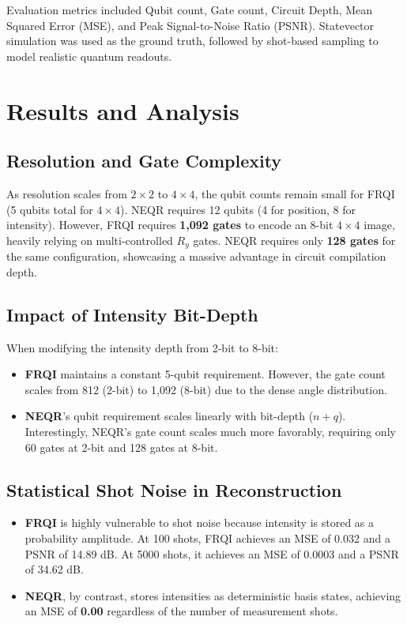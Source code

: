 \documentclass[conference]{IEEEtran}
\begin{document}
Evaluation metrics included Qubit count, Gate count, Circuit Depth, Mean Squared Error (MSE), and Peak Signal-to-Noise Ratio (PSNR). Statevector simulation was used as the ground truth, followed by shot-based sampling to model realistic quantum readouts.

\section{Results and Analysis}

\subsection{Resolution and Gate Complexity}
As resolution scales from $2\times2$ to $4\times4$, the qubit counts remain small for FRQI (5 qubits total for $4\times4$). NEQR requires 12 qubits (4 for position, 8 for intensity). However, FRQI requires \textbf{1,092 gates} to encode an 8-bit $4\times4$ image, heavily relying on multi-controlled $R_y$ gates. NEQR requires only \textbf{128 gates} for the same configuration, showcasing a massive advantage in circuit compilation depth.

\subsection{Impact of Intensity Bit-Depth}
When modifying the intensity depth from 2-bit to 8-bit:
\begin{itemize}
\item \textbf{FRQI} maintains a constant 5-qubit requirement. However, the gate count scales from 812 (2-bit) to 1,092 (8-bit) due to the dense angle distribution.
\item \textbf{NEQR}'s qubit requirement scales linearly with bit-depth ($n+q$). Interestingly, NEQR's gate count scales much more favorably, requiring only 60 gates at 2-bit and 128 gates at 8-bit.
\end{itemize}

\subsection{Statistical Shot Noise in Reconstruction}
\begin{itemize}
\item \textbf{FRQI} is highly vulnerable to shot noise because intensity is stored as a probability amplitude. At 100 shots, FRQI achieves an MSE of 0.032 and a PSNR of 14.89 dB. At 5000 shots, it achieves an MSE of 0.0003 and a PSNR of 34.62 dB.
\item \textbf{NEQR}, by contrast, stores intensities as deterministic basis states, achieving an MSE of \textbf{0.00} regardless of the number of measurement shots.
\end{itemize}
\end{document}

